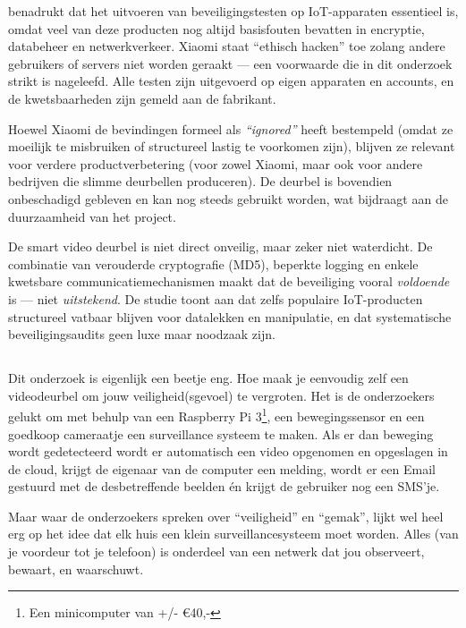 \documentclass[nonacm,sigconf]{acmart}
\begin{document}
    \citeauthor{liu2021ethical} benadrukt dat het uitvoeren van beveiligingstesten op IoT-apparaten essentieel is, omdat veel van deze producten nog altijd basisfouten bevatten in encryptie, databeheer en netwerkverkeer.
    Xiaomi staat “ethisch hacken” toe zolang andere gebruikers of servers niet worden geraakt — een voorwaarde die in dit onderzoek strikt is nageleefd.
    Alle testen zijn uitgevoerd op eigen apparaten en accounts, en de kwetsbaarheden zijn gemeld aan de fabrikant.

    Hoewel Xiaomi de bevindingen formeel als \textit{“ignored”} heeft bestempeld (omdat ze moeilijk te misbruiken of structureel lastig te voorkomen zijn), blijven ze relevant voor verdere productverbetering (voor zowel Xiaomi, maar ook voor andere bedrijven die slimme deurbellen produceren).
    De deurbel is bovendien onbeschadigd gebleven en kan nog steeds gebruikt worden, wat bijdraagt aan de duurzaamheid van het project.

    De smart video deurbel is niet direct onveilig, maar zeker niet waterdicht.
    De combinatie van verouderde cryptografie (MD5), beperkte logging en enkele kwetsbare communicatiemechanismen maakt dat de beveiliging vooral \textit{voldoende} is — niet \textit{uitstekend}.
    De studie toont aan dat zelfs populaire IoT-producten structureel vatbaar blijven voor datalekken en manipulatie, en dat systematische beveiligingsaudits geen luxe maar noodzaak zijn.

    \subsection{}

    \parencite{lalitha2019smart} Dit onderzoek is eigenlijk een beetje eng.
    Hoe maak je eenvoudig zelf een videodeurbel om jouw veiligheid(sgevoel) te vergroten.
    Het is de onderzoekers gelukt om met behulp van een Raspberry Pi 3\footnote{Een minicomputer van +/- €40,-}, een bewegingssensor en een goedkoop cameraatje een surveillance systeem te maken.
    Als er dan beweging wordt gedetecteerd wordt er automatisch een video opgenomen en opgeslagen in de cloud, krijgt de eigenaar van de computer een melding, wordt er een Email gestuurd met de desbetreffende beelden én krijgt de gebruiker nog een SMS'je.

    Maar waar de onderzoekers spreken over “veiligheid” en “gemak”, lijkt wel heel erg op het idee dat elk huis een klein surveillancesysteem moet worden.
    Alles (van je voordeur tot je telefoon) is onderdeel van een netwerk dat jou observeert, bewaart, en waarschuwt.
\end{document}
